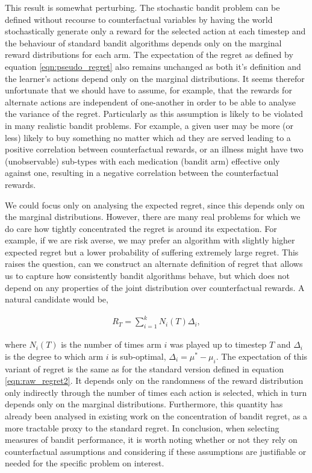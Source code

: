 \documentclass[11pt,a4paper,oneside]{book}
\newcommand{\eqn}[1]{\begin{align}#1\end{align}}
\theoremstyle{plain}
\theoremstyle{definition}
\begin{document}
This result is somewhat perturbing. The stochastic bandit problem can be defined without recourse to counterfactual variables by having the world stochastically generate only a reward for the selected action at each timestep and the behaviour of standard bandit algorithms depends only on the marginal reward distributions for each arm. The expectation of the regret as defined by equation \ref{eqn:pseudo_regret} also remains unchanged as both it's definition and the learner's actions depend only on the marginal distributions. It seems therefor unfortunate that we should have to assume, for example, that the rewards for alternate actions are independent of one-another in order to be able to analyse the variance of the regret. Particularly as this assumption is likely to be violated in many realistic bandit problems. For example, a given user may be more (or less) likely to buy something no matter which ad they are served leading to a positive correlation between counterfactual rewards, or an illness might have two (unobservable) sub-types with each medication (bandit arm) effective only against one, resulting in a negative correlation between the counterfactual rewards. 

We could focus only on analysing the expected regret, since this depends only on the marginal distributions. However, there are many real problems for which we do care how tightly concentrated the regret is around its expectation. For example, if we are risk averse, we may prefer an algorithm with slightly higher expected regret but a lower probability of suffering extremely large regret. This raises the question, can we construct an alternate definition of regret that allows us to capture how consistently bandit algorithms behave, but which does not depend on any properties of the joint distribution over counterfactual rewards. A natural candidate would be,

\eqn{
R_T = \sum_{i=1}^k N_i(T)\Delta_i, 
}

where $N_i(T)$ is the number of times arm $i$ was played up to timestep $T$ and $\Delta_i$ is the degree to which arm $i$ is sub-optimal, $\Delta_i = \mu^* - \mu_i$. The expectation of this variant of regret is the same as for the standard version defined in equation \ref{eqn:raw_regret2}. It depends only on the randomness of the reward distribution only indirectly through the number of times each action is selected, which in turn depends only on the marginal distributions. Furthermore, this quantity has already been analysed in existing work on the concentration of bandit regret, \citep{Audibert2007,Audibert2009exploration} as a more tractable proxy to the standard regret. In conclusion, when selecting measures of bandit performance, it is worth noting whether or not they rely on counterfactual assumptions and considering if these assumptions are justifiable or needed for the specific problem on interest.
\end{document}
